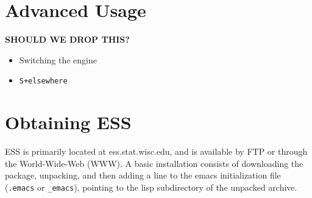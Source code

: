 \documentclass{article}
\begin{document}



\section{Advanced Usage}
\label{sec:advanced}

\textbf{SHOULD WE DROP THIS?}

\begin{itemize}
\item Switching the engine
\item \texttt{S+elsewhere}

\end{itemize}

\section{Obtaining ESS}
\label{sec:getIt}

ESS is primarily located at ess.stat.wisc.edu, and is available by FTP
or through the World-Wide-Web (WWW).  A basic installation consists of
downloading the package, unpacking, and then adding a line to the
emacs initialization file (\verb+.emacs+ or \verb+_emacs+), pointing
to the lisp subdirectory of the unpacked archive.
\end{document}
